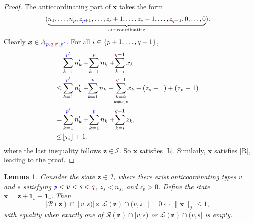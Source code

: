 \documentclass[10 pt,twocolumn,journal]{IEEEtran}
\DeclarePairedDelimiter{\floor}{\lfloor}{\rfloor}
\theoremstyle{plain}
\newtheorem{lemma}{Lemma}
\newcommand{\I}{\mathcal{I}}
\newcommand{\X}{\mathcal{X}}
\newcommand{\R}{\mathcal{R}}
\renewcommand{\L}{\mathcal{L}}
\newcommand{\x}{\bm{x}}
\newcommand{\z}{\bm{z}}
\newcommand{\p}{\tb{p}}
\newcommand{\pp}{\tb{p'}}
\newcommand{\q}{\tr{q}}
\newcommand{\qq}{\tr{q'}}
\newcommand{\tb}{\textcolor{blue}}
\newcommand{\tr}{\textcolor{Myred}}
\theoremstyle{definition}
\begin{document}
\begin{proof}
    The anticoordinating part of $\x$ takes the form
    \begin{equation*}\scalebox{.95}{\text{$
        (\underbrace{n_1,\ldots,n_{\p},z_{\p+1},\ldots,
        z_s+1, \ldots, z_v-1,
        \ldots,z_{\q-1}, 0,\ldots,0}_{\text{anticoordinating}})$}}.
    \end{equation*}  
    Clearly $\x\in\X_{\p,\q,\qq,\pp}$.
    For all $i\in\{\p+1,\ldots,\q-1\}$, 
\begin{align*} %
    &\sum_{k=1}^{\pp} n'_k +\! \sum_{k=1}^{\p} n_k +\! \sum_{k=i}^{\q-1} x_k \nonumber\\
    \leq &\sum_{k=1}^{\pp} n'_k +\!\! \sum_{k=1}^{\p} n_k +\! \sum_{\substack{k=i;\\ k\neq s,v}}^{\q-1}\!\! x_k + (z_s + 1) + (z_v-1)  \nonumber\\
    =& 
    \sum_{k=1}^{\pp} n'_k +\! \sum_{k=1}^{\p} n_k +\! \sum_{k=i}^{\q-1}z_k, \nonumber \\%
    \leq&
    \floor{\tau_i}+1.
\end{align*}
where the last inequality follows $\z\in\I$.
So $\x$ satisfies \eqref{L}. 
Similarly, $\x$ satisfies \eqref{R}, leading to the proof. 
\end{proof}
%
\begin{lemma} \label{lem_stability}
    Consider the state $\z\in\I$, where there exist anticoordinating types $v$ and $s$ satisfying $\p<v<s<\q$, $z_s< n_s$, and $z_v>0$.
    Define the state $\x = \z + \bm{1}_s - \bm{1}_v$.
    Then 
    \begin{equation*}
        |\R(\z)\cap[v,s)| \times |\L(\z)\cap(v,s]| = 0
        \iff
        \|\x\|_{\I} \leq 1,
    \end{equation*}
    with equality when exactly one of $\R(\z)\cap[v,s)$ or $\L(\z)\cap(v,s]$ is empty.
\end{lemma}
\end{document}
